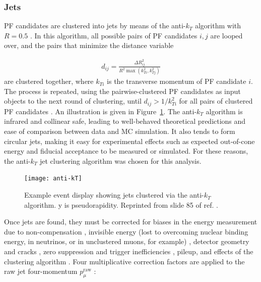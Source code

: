 \documentclass[dissertation.tex]{subfiles}
\begin{document}
\subsubsection{Jets}
\label{sec:Jets}

PF candidates are clustered into jets by means of the anti-$k_{T}$ algorithm with $R = 0.5$ \cite{AK5}.  In this algorithm, all possible pairs of PF candidates $i, j$ are looped over, and the pairs that minimize the distance variable

\begin{eqnarray}
d_{ij} = \frac{\Delta R_{ij}^{2}}{R^{2}\max(k_{Ti}^{2}, k_{Tj}^{2})}
\end{eqnarray}
%
are clustered together, where $k_{Ti}$ is the transverse momentum of PF candidate $i$.  The process is repeated, using the pairwise-clustered PF candidates as input objects to the next round of clustering, until $d_{ij} > 1/k_{Ti}^{2}$ for all pairs of clustered PF candidates \cite{Salam_talk}.  An illustration is given in Figure~\ref{fig:anti-kT}.  The anti-$k_{T}$ algorithm is infrared and collinear safe, leading to well-behaved theoretical predictions and ease of comparison between data and MC simulation.  It also tends to form circular jets, making it easy for experimental effects such as expected out-of-cone energy and fiducial acceptance to be measured or simulated.  For these reasons, the anti-$k_{T}$ jet clustering algorithm was chosen for this analysis.

\begin{figure}
	\centering
	\texttt{[image: anti-kT]}
	\caption{Example event display showing jets clustered via the anti-$k_{T}$ algorithm.  y is pseudorapidity.  Reprinted from slide 85 of ref. \cite{Salam_talk}.}
	\label{fig:anti-kT}
\end{figure}

Once jets are found, they must be corrected for biases in the energy measurement due to non-compensation \cite{Wigmans}, invisible energy (lost to overcoming nuclear binding energy, in neutrinos, or in unclustered muons, for example) \cite{Wigmans}, detector geometry and cracks \cite{CDF_JEC_website}, zero suppression and trigger inefficiencies \cite{CMS_MET_paper}, pileup, and effects of the clustering algorithm \cite{CDF_JEC_website}.  Four multiplicative correction factors are applied to the raw jet four-momentum $p_{\mu}^{\mathrm{raw}}$ \cite{CMS_JES_paper}:
\end{document}
